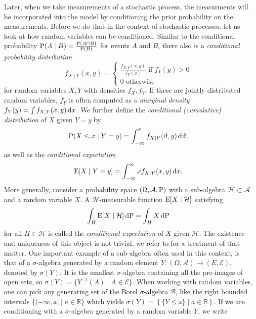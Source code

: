 Later, when we take measurements of a stochastic process, the measurments will be incorporated into the model by conditioning the prior probability on the measurements.
Before we do that in the context of stochastic processes, let us look at how random variables can be conditioned.
Similar to the conditional probability \( \Prob(A \mid B) = \frac{\Prob( A \cap B)}{\Prob(B)} \) for events $A$ and $B$,
there also is a \textit{conditional probability distribution}
\[
    f_{X \mid Y}(x,y) = \begin{cases} \frac{f_{X,Y}(x,y)}{f_{Y}(y)} \text{ if } f_{Y}(y) > 0\\ 
        0 \text{ otherwise}\end{cases} 
\]
for random variables \( X,Y \) with densities \( f_{X}, f_{Y} \).
If these are jointly distributed random variables, \( f_{Y} \) is often computed as a \textit{marginal density} \( f_{Y}(y)= \int f_{X,Y}(x,y) \dx \).
We further define the \textit{conditional (cumulative) distribution} of $X$ given $Y=y$ by
\[
    \Prob(X \leq x \mid Y = y) = \int_{-\infty}^{x} f_{X \mid Y}(\vartheta ,y) \dx[\vartheta],
\]
as well as the \textit{conditional expectation}
\[
    \E[X \mid Y = y] = \int_{-\infty}^{\infty} x f_{X \mid Y}(x,y) \dx.
\]
More generally, consider a probability space \( (\Omega,\mathcal{A},\Prob) \) with a sub-algebra \( \mathcal{H} \subset \mathcal{A}  \) and a random variable $X$. A $\mathcal{H}$-measurable function \( \E[X \mid \mathcal{H}] \) satisfying
\[
    \int_{H} \E[X \mid \mathcal{H}] \dx[\Prob] = \int_{H} X \dx[\Prob]
\]
for all \( H \in \mathcal{H} \) is called the \textit{conditional expectation} of $X$ given $\mathcal{H}$.
The existence and uniqueness of this object is not trivial, we refer to \cite{bremaud2020probability} for a treatment of that matter.
One important example of a sub-algebra often used in this context, is that of a $\sigma$-algebra generated by a random element \( Y \colon (\Omega,\mathcal{A}) \to (E,\mathcal{E}),\) denoted by \(\sigma(Y)\). It is the smallest $\sigma$-algebra containing all the pre-images of open sets, so \( \sigma(Y) = \{ Y^{-1}(A) \mid A \in \mathcal{E} \} \). When working with random variables, one can pick any generating set of the Borel $\sigma$-algebra $\mathcal{B}$, like the right bounded intervals \(\{(-\infty,a]\mid a \in \mathbb{R} \}\) which yields \(  \sigma(Y)= \left\{ \{ Y \leq a\} \mid a \in \mathbb{R}\right\} \).
If we are conditioning with a $\sigma$-algebra generated by a random variable $Y$, we write
